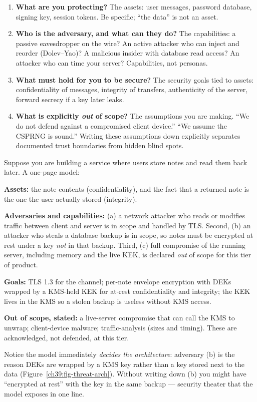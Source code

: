 \begin{enumerate}
  \item \textbf{What are you protecting?} The assets: user messages, password
  database, signing key, session tokens. Be specific; ``the data'' is not an asset.
  \item \textbf{Who is the adversary, and what can they do?} The capabilities: a
  passive eavesdropper on the wire? An active attacker who can inject and reorder
  (Dolev--Yao)? A malicious insider with database read access? An attacker who can
  time your server? Capabilities, not personas.
  \item \textbf{What must hold for you to be secure?} The security goals tied to
  assets: confidentiality of messages, integrity of transfers, authenticity of the
  server, forward secrecy if a key later leaks.
  \item \textbf{What is explicitly \emph{out} of scope?} The assumptions you are
  making. ``We do not defend against a compromised client device.'' ``We assume the
  CSPRNG is sound.'' Writing these assumptions down explicitly separates
  documented trust boundaries from hidden blind spots.
\end{enumerate}

\begin{example}
\label{ch39:threatmodel-ex}
Suppose you are building a service where users store notes and read them back later.
A one-page model:

\textbf{Assets:} the note contents (confidentiality), and the fact that a returned
note is the one the user actually stored (integrity).

\textbf{Adversaries and capabilities:} (a) a network attacker who reads or
modifies traffic between client and server is in scope and handled by TLS. Second, (b) an
attacker who steals a database backup is in scope, so notes must be encrypted at
rest under a key \emph{not} in that backup. Third, (c) full compromise of
the running server, including memory and the live KEK, is declared \emph{out} of
scope for this tier of product.

\textbf{Goals:} TLS 1.3 for the channel; per-note envelope encryption with DEKs
wrapped by a KMS-held KEK for at-rest confidentiality and integrity; the KEK lives
in the KMS so a stolen backup is useless without KMS access.

\textbf{Out of scope, stated:} a live-server compromise that can call the KMS to
unwrap; client-device malware; traffic-analysis (sizes and timing). These are
acknowledged, not defended, at this tier.

Notice the model immediately \emph{decides the architecture}: adversary (b) is the
reason DEKs are wrapped by a KMS key rather than a key stored next to the data (Figure~\ref{ch39:fig-threat-arch}).
Without writing down (b) you might have ``encrypted at rest'' with the key in the
same backup --- security theater that the model exposes in one line.
\end{example}

